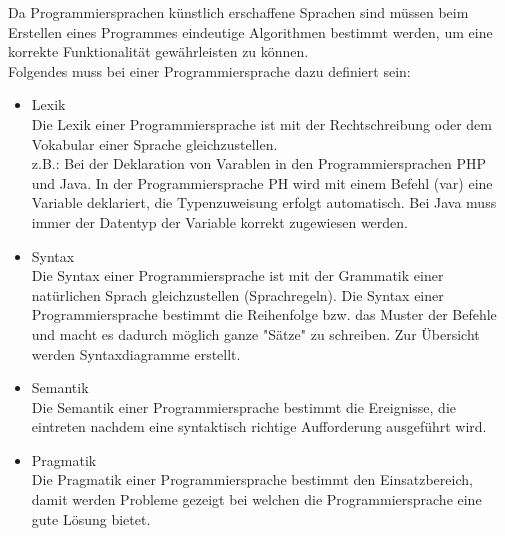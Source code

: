 \documentclass[12pt,a4paper]{report}
\begin{document}
Da Programmiersprachen künstlich erschaffene Sprachen sind müssen beim Erstellen eines Programmes eindeutige Algorithmen bestimmt werden, um eine korrekte Funktionalität gewährleisten zu können.\\
Folgendes muss bei einer Programmiersprache dazu definiert sein:

\begin{itemize}
\item Lexik\\
Die Lexik einer Programmiersprache ist mit der Rechtschreibung oder dem Vokabular einer Sprache gleichzustellen.\\
z.B.: Bei der Deklaration von Varablen in den Programmiersprachen PHP und Java. In der Programmiersprache PH wird mit einem Befehl (var) eine Variable deklariert, die Typenzuweisung erfolgt automatisch. Bei Java muss immer der Datentyp der Variable korrekt zugewiesen werden.
\item Syntax\\
Die Syntax einer Programmiersprache ist mit der Grammatik einer natürlichen Sprach gleichzustellen (Sprachregeln).
Die Syntax einer Programmiersprache bestimmt die Reihenfolge bzw. das Muster der Befehle und macht es dadurch möglich ganze "Sätze" zu schreiben. Zur Übersicht werden Syntaxdiagramme erstellt.
\item Semantik\\
Die Semantik einer Programmiersprache bestimmt die Ereignisse, die eintreten nachdem eine syntaktisch richtige Aufforderung ausgeführt wird.
\item Pragmatik\\
Die Pragmatik einer Programmiersprache bestimmt den Einsatzbereich, damit werden Probleme gezeigt bei welchen die Programmiersprache eine gute Lösung bietet.
\end{itemize}
\end{document}
